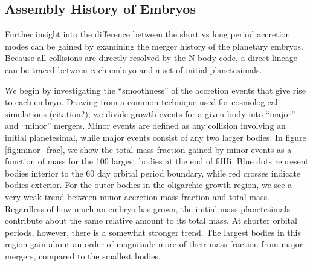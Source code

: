 \documentclass[twocolumn]{aastex63}
\begin{document}

\subsection{Assembly History of Embryos}\label{sec:assembly}

Further insight into the difference between the short vs long period accretion modes can be gained by examining the merger history of the planetary embryos. Because all collisions are directly resolved by the N-body code, a direct lineage can be traced between each embryo and a set of initial planetesimals.

We begin by investigating the ``smoothness'' of the accretion events
that give rise to each embryo. Drawing from a common technique used
for cosmological simulations (citation?), we divide growth events for
a given body into ``major'' and ``minor'' mergers. Minor events are defined as any collision involving an initial planetesimal, while major events consist of any two larger bodies. In figure \ref{fig:minor_frac}, we show the total mass fraction gained by minor events as a function of mass for the 100 largest bodies at the end of fdHi. Blue dots represent bodies interior to the 60 day orbital period boundary, while red crosses indicate bodies exterior. For the outer bodies in the oligarchic growth region, we see a very weak trend between minor accretion mass fraction and total mass. Regardless of how much an embryo has grown, the initial mass planetesimals contribute about the same relative amount to its total mass. At shorter orbital periods, however, there is a somewhat stronger trend. The largest bodies in this region gain about an order of magnitude more of their mass fraction from major mergers, compared to the smallest bodies.
\end{document}
